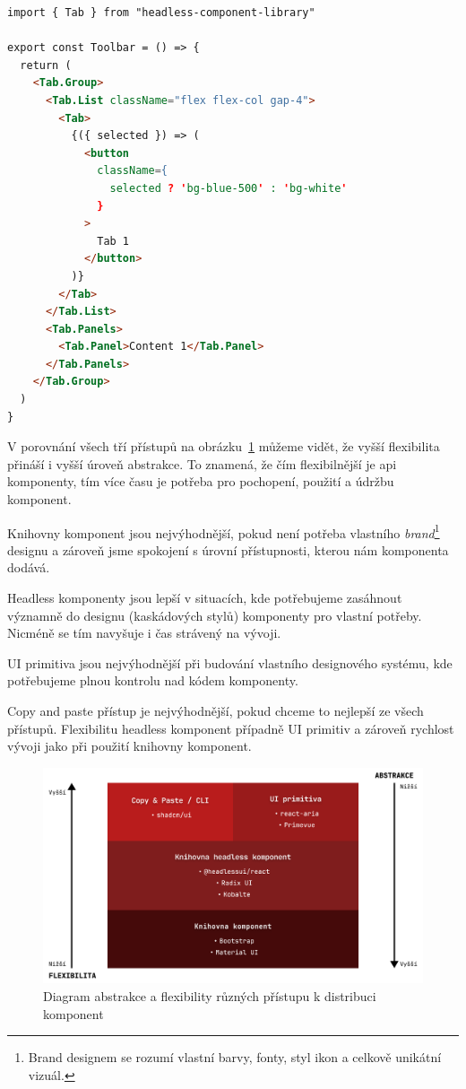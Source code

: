 \begin{lstlisting}[caption={Ukázka použití headless knihovny}, label={component-distribution-2}, language=html]
import { Tab } from "headless-component-library"

export const Toolbar = () => {
  return (
    <Tab.Group>
      <Tab.List className="flex flex-col gap-4">
        <Tab>
          {({ selected }) => (
            <button
              className={
                selected ? 'bg-blue-500' : 'bg-white'
              }
            >
              Tab 1
            </button>
          )}
        </Tab>
      </Tab.List>
      <Tab.Panels>
        <Tab.Panel>Content 1</Tab.Panel>
      </Tab.Panels>
    </Tab.Group>
  )
}
\end{lstlisting}

V porovnání všech tří přístupů na obrázku~\ref{component-lib-distribution-comparison} můžeme vidět, že vyšší flexibilita přináší i vyšší úroveň abstrakce.
To znamená, že čím flexibilnější je \gls{api} komponenty, tím více času je potřeba pro pochopení, použití a údržbu komponent.

Knihovny komponent jsou nejvýhodnější, pokud není potřeba vlastního \textit{brand}\footnote{Brand designem se rozumí vlastní barvy, fonty, styl ikon a celkově unikátní vizuál.} designu a zároveň jsme spokojení s úrovní přístupnosti, kterou nám komponenta dodává.

Headless komponenty jsou lepší v situacích, kde potřebujeme zasáhnout významně do designu (kaskádových stylů) komponenty pro vlastní potřeby.
Nicméně se tím navyšuje i čas strávený na vývoji.

UI primitiva jsou nejvýhodnější při budování vlastního designového systému, kde potřebujeme plnou kontrolu nad kódem komponenty.

Copy and paste přístup je nejvýhodnější, pokud chceme to nejlepší ze všech přístupů.
Flexibilitu headless komponent případně UI primitiv a zároveň rychlost vývoji jako při použití knihovny komponent.

\begin{figure}[h]
      \centering
      \includegraphics[width=\textwidth]{./assets/figures/component-lib-distribution-comparison.png}
      \captionsetup{justification=centering}
      \caption{Diagram abstrakce a flexibility různých přístupu k distribuci komponent}
      \label{component-lib-distribution-comparison}
\end{figure}

